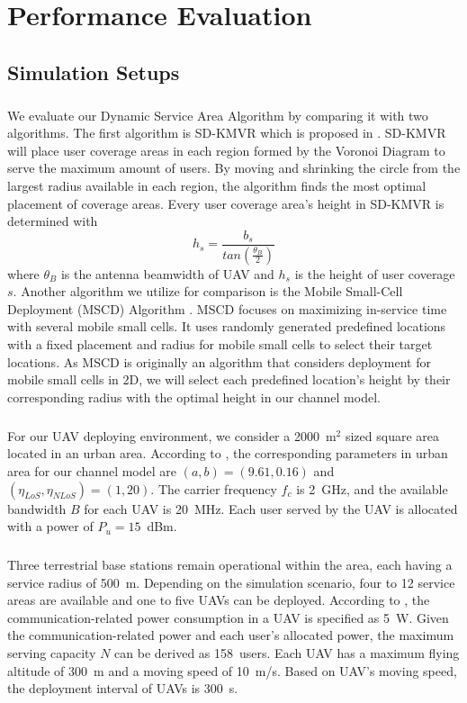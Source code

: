\documentclass[a4paper,12pt]{report}
\begin{document}
\chapter{Performance Evaluation}
\section{Simulation Setups}
\paragraph{}
We evaluate our Dynamic Service Area Algorithm by comparing it with two algorithms. The first algorithm is \mbox{SD-KMVR} which is proposed in \cite{b14}. SD-KMVR will place user coverage areas in each region formed by the Voronoi Diagram to serve the maximum amount of users. By moving and shrinking the circle from the largest radius available in each region, the algorithm finds the most optimal placement of coverage areas. Every user coverage area's height in SD-KMVR is determined with \begin{equation}\label{SD-KMVR height}
    h_s = \frac{b_s}{tan(\frac{\theta _B}{2})}
\end{equation}
where $\theta_B$ is the antenna beamwidth of UAV and $h_s$ is the height of user coverage $s$. Another algorithm we utilize for comparison is the Mobile Small-Cell Deployment (MSCD) Algorithm \cite{b12}. MSCD focuses on maximizing in-service time with several mobile small cells. It uses randomly generated predefined locations with a fixed placement and radius for mobile small cells to select their target locations. As MSCD is originally an algorithm that considers deployment for mobile small cells in 2D, we will select each predefined location's height by their corresponding radius with the optimal height in our channel model.
\paragraph{}
For our UAV deploying environment, we consider a 2000~m$^2$ sized square area located in an urban area. According to \cite{b8}, the corresponding parameters in urban area for our channel model are $(a, b)=(9.61, 0.16)$ and $(\eta _{LoS}, \eta _{NLoS})=(1, 20)$. The carrier frequency $f_c$ is 2~GHz, and the available bandwidth $B$ for each UAV is 20~MHz. Each user served by the UAV is allocated with a power of $P_u = 15$~dBm.
\paragraph{}
Three terrestrial base stations remain operational within the area, each having a service radius of 500~m. Depending on the simulation scenario, four to 12 service areas are available and one to five UAVs can be deployed. According to \cite{b22}, the communication-related power consumption in a UAV is specified as 5~W. Given the communication-related power and each user's allocated power, the maximum serving capacity $N$ can be derived as 158~users. Each UAV has a maximum flying altitude of 300~m \cite{b23} and a moving speed of 10~m/s. Based on UAV's moving speed, the deployment interval of UAVs is 300~s.
\end{document}
